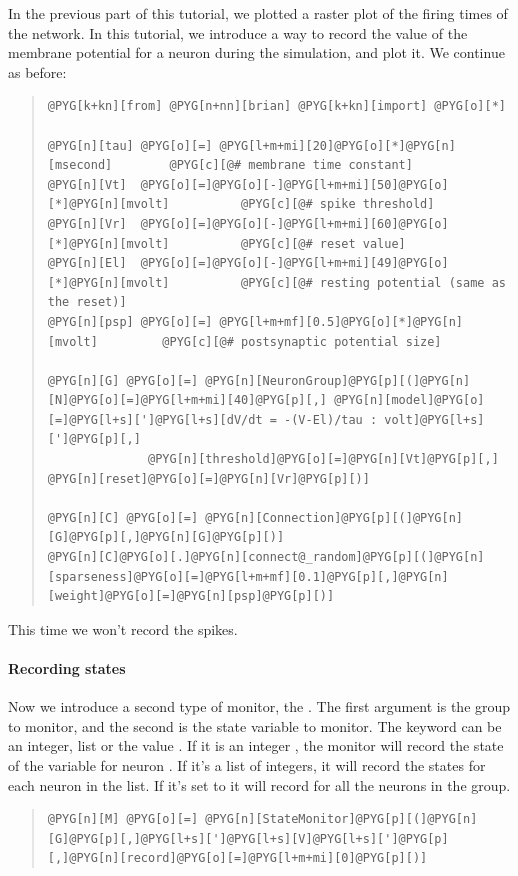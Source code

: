 \documentclass[letterpaper,10pt,english]{manual}
\begin{document}
In the previous part of this tutorial, we plotted a raster plot of
the firing times of the network. In this tutorial, we introduce
a way to record the value of the membrane potential for a neuron
during the simulation, and plot it. We continue as before:
\begin{quote}

\begin{Verbatim}[commandchars=@\[\]]
@PYG[k+kn][from] @PYG[n+nn][brian] @PYG[k+kn][import] @PYG[o][*]

@PYG[n][tau] @PYG[o][=] @PYG[l+m+mi][20]@PYG[o][*]@PYG[n][msecond]        @PYG[c][@# membrane time constant]
@PYG[n][Vt]  @PYG[o][=]@PYG[o][-]@PYG[l+m+mi][50]@PYG[o][*]@PYG[n][mvolt]          @PYG[c][@# spike threshold]
@PYG[n][Vr]  @PYG[o][=]@PYG[o][-]@PYG[l+m+mi][60]@PYG[o][*]@PYG[n][mvolt]          @PYG[c][@# reset value]
@PYG[n][El]  @PYG[o][=]@PYG[o][-]@PYG[l+m+mi][49]@PYG[o][*]@PYG[n][mvolt]          @PYG[c][@# resting potential (same as the reset)]
@PYG[n][psp] @PYG[o][=] @PYG[l+m+mf][0.5]@PYG[o][*]@PYG[n][mvolt]         @PYG[c][@# postsynaptic potential size]

@PYG[n][G] @PYG[o][=] @PYG[n][NeuronGroup]@PYG[p][(]@PYG[n][N]@PYG[o][=]@PYG[l+m+mi][40]@PYG[p][,] @PYG[n][model]@PYG[o][=]@PYG[l+s][']@PYG[l+s][dV/dt = -(V-El)/tau : volt]@PYG[l+s][']@PYG[p][,]
              @PYG[n][threshold]@PYG[o][=]@PYG[n][Vt]@PYG[p][,] @PYG[n][reset]@PYG[o][=]@PYG[n][Vr]@PYG[p][)]

@PYG[n][C] @PYG[o][=] @PYG[n][Connection]@PYG[p][(]@PYG[n][G]@PYG[p][,]@PYG[n][G]@PYG[p][)]
@PYG[n][C]@PYG[o][.]@PYG[n][connect@_random]@PYG[p][(]@PYG[n][sparseness]@PYG[o][=]@PYG[l+m+mf][0.1]@PYG[p][,]@PYG[n][weight]@PYG[o][=]@PYG[n][psp]@PYG[p][)]
\end{Verbatim}
\end{quote}

This time we won't record the spikes.


\paragraph{Recording states}

Now we introduce a second type of monitor, the \hyperlink{brian.StateMonitor}{}.
The first argument is the group to monitor, and the second is
the state variable to monitor. The keyword  can be
an integer, list or the value . If it is an integer ,
the monitor will record the state of the variable for neuron .
If it's a list of integers, it will record the states for
each neuron in the list. If it's set to  it will record
for all the neurons in the group.
\begin{quote}

\begin{Verbatim}[commandchars=@\[\]]
@PYG[n][M] @PYG[o][=] @PYG[n][StateMonitor]@PYG[p][(]@PYG[n][G]@PYG[p][,]@PYG[l+s][']@PYG[l+s][V]@PYG[l+s][']@PYG[p][,]@PYG[n][record]@PYG[o][=]@PYG[l+m+mi][0]@PYG[p][)]
\end{Verbatim}
\end{quote}
\end{document}
